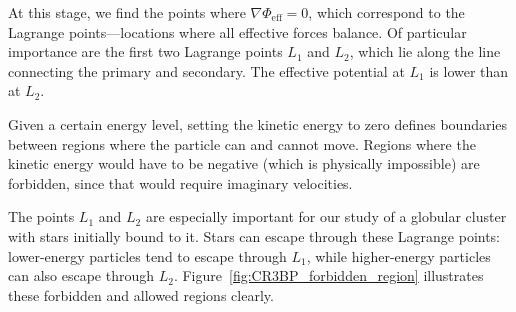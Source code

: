         At this stage, we find the points where \(\nabla \Phi_\mathrm{eff} = 0\), which correspond to the Lagrange points—locations where all effective forces balance. Of particular importance are the first two Lagrange points \(L_1\) and \(L_2\), which lie along the line connecting the primary and secondary. The effective potential at \(L_1\) is lower than at \(L_2\).

        Given a certain energy level, setting the kinetic energy to zero defines boundaries between regions where the particle can and cannot move. Regions where the kinetic energy would have to be negative (which is physically impossible) are forbidden, since that would require imaginary velocities.

        The points \(L_1\) and \(L_2\) are especially important for our study of a globular cluster with stars initially bound to it. Stars can escape through these Lagrange points: lower-energy particles tend to escape through \(L_1\), while higher-energy particles can also escape through \(L_2\). Figure~\ref{fig:CR3BP_forbidden_region} illustrates these forbidden and allowed regions clearly.
